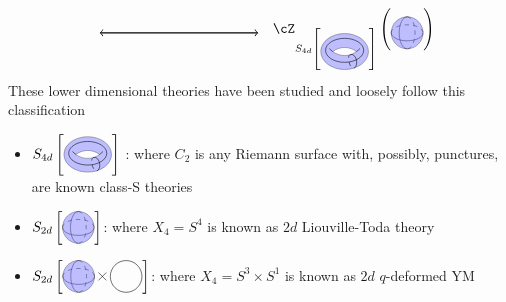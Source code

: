 \begin{equation*}
\begin{array}{rcl}
	&\begin{tikzpicture}[baseline={(0,0)}]
		\draw[thick,<->] (1,0) -- (5,0);
	\end{tikzpicture}&\cZ_{S_{4d}\left[\begin{tikzpicture}[scale=.6, baseline={(0,0)}]
		\draw[fill=blue!50,opacity=.5,even odd rule] (0,0) ellipse (1 and .75) 
		(-0.5,0) arc(120:60:1 and 1.25)  arc(-60:-120:1 and 1.25) coordinate[pos=0.25] (xt);
		\draw (-0.5,0) arc(-120:-130:1 and 1.25) (0.5,0) arc(-60:-50:1 and 1.25);
		\draw[] (-65:1 and .75) to[out=40,in=10] 
		node[pos=0.2,right]{} (xt);
		\draw[dashed] (xt) to[out=-170,in=-140] (-65:1 and .75);
		\draw[] (0.8,0.05) arc(0:360:0.8 and .5) {};
	\end{tikzpicture}\right]}\left(\begin{tikzpicture}[scale=.4,baseline={(0,0)}]
		\draw (-1,0) arc (180:360:1cm and 0.5cm);
		\draw[dashed] (-1,0) arc (180:0:1cm and 0.5cm);
		\draw (0,1) arc (90:270:0.5cm and 1cm);
		\draw[dashed] (0,1) arc (90:-90:0.5cm and 1cm);
		\filldraw[fill=blue!50, opacity=.5] (0,0) circle (1cm);
	\end{tikzpicture}\right)
\end{array}
\end{equation*}
These lower dimensional theories have been studied and loosely follow this classification
\begin{itemize}
	\item
		$S_{4d}\left[\begin{tikzpicture}[scale=.6, baseline={(0,-.1)}]
			\draw[fill=blue!50,opacity=.5,even odd rule] (0,0) ellipse (1 and .75) 
			(-0.5,0) arc(120:60:1 and 1.25)  arc(-60:-120:1 and 1.25) coordinate[pos=0.25] (xt);
			\draw (-0.5,0) arc(-120:-130:1 and 1.25) (0.5,0) arc(-60:-50:1 and 1.25);
			\draw[] (-65:1 and .75) to[out=40,in=10] 
			node[pos=0.2,right]{} (xt);
			\draw[dashed] (xt) to[out=-170,in=-140] (-65:1 and .75);
			\draw[] (0.8,0.05) arc(0:360:0.8 and .5) {};
		\end{tikzpicture}\right]$ : where $C_2$ is any Riemann surface with, possibly, punctures, are known class-S theories
	\item $S_{2d}\left[\begin{tikzpicture}[scale=.4,baseline={(0,-.1)}]
		\draw (-1,0) arc (180:360:1cm and 0.5cm);
		\draw[dashed] (-1,0) arc (180:0:1cm and 0.5cm);
		\draw (0,1) arc (90:270:0.5cm and 1cm);
		\draw[dashed] (0,1) arc (90:-90:0.5cm and 1cm);
		\filldraw[fill=blue!50, opacity=.5] (0,0) circle (1cm);
	\end{tikzpicture}\right]$: where $X_4=S^4$ is known as $2d$ Liouville-Toda theory
	\item $S_{2d}\left[\begin{tikzpicture}[scale=.4,baseline={(0,-.1)}]
		\draw (-1,0) arc (180:360:1cm and 0.5cm);
		\draw[dashed] (-1,0) arc (180:0:1cm and 0.5cm);
		\draw (0,1) arc (90:270:0.5cm and 1cm);
		\draw[dashed] (0,1) arc (90:-90:0.5cm and 1cm);
		\filldraw[fill=blue!50, opacity=.5] (0,0) circle (1cm);
		\draw plot[mark=x,scale=5] coordinates{(0.30,0)};
		\draw (3,0) circle (1cm);
	\end{tikzpicture}\right]$: where $X_4=S^3\times S^1$ is known as $2d$ $q$-deformed YM
\end{itemize}

